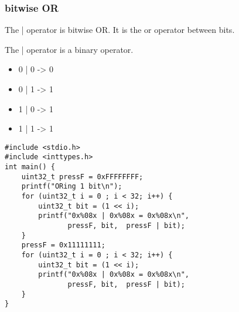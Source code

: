 \documentclass[11pt]{article}
\begin{document}
\subsubsection{bitwise OR}
\label{sec:org5916f83}

The | operator is bitwise OR. It is the or operator between
bits. 

The | operator is a binary operator.

\begin{itemize}
\item 0 | 0 -> 0
\item 0 | 1 -> 1
\item 1 | 0 -> 1
\item 1 | 1 -> 1
\end{itemize}

\begin{verbatim}
#include <stdio.h>
#include <inttypes.h>
int main() {  
    uint32_t pressF = 0xFFFFFFFF;
    printf("ORing 1 bit\n");
    for (uint32_t i = 0 ; i < 32; i++) {
        uint32_t bit = (1 << i);
        printf("0x%08x | 0x%08x = 0x%08x\n",
               pressF, bit,  pressF | bit);
    }
    pressF = 0x11111111;
    for (uint32_t i = 0 ; i < 32; i++) {
        uint32_t bit = (1 << i);
        printf("0x%08x | 0x%08x = 0x%08x\n",
               pressF, bit,  pressF | bit);
    }
}
\end{verbatim}
\end{document}
